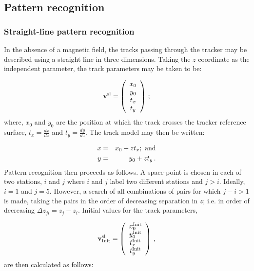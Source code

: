 \subsection{Pattern recognition}
\label{Sect:SciFiPatRec}

\subsubsection{Straight-line pattern recognition}
\label{SubSect:SciFiSLPatRec}

In the absence of a magnetic field, the tracks passing through the tracker may be described using a straight line in three dimensions. Taking the $z$ coordinate as the independent parameter, the track parameters may be taken to be:

\begin{equation}
 {\bf v^{\rm sl}} =
 \left( 
   \begin{array}{c}
     x_0 \\
     y_0 \\
     t_x \\
     t_y
   \end{array}
 \right)\,;
\end{equation}
where, $x_0$ and $y_0$ are the position at which the track crosses the tracker reference surface, $t_x = \frac{dx}{dz}$ and $t_y = \frac{dy}{dz}$. The track model may then be written:

\begin{eqnarray}
  x & = & x_0 + z t_x {\rm;~and} \\
  y & = & y_0 + z t_y \,.
\end{eqnarray}
Pattern recognition then proceeds as follows. A space-point is chosen in each of two stations, $i$ and $j$ where $i$ and $j$ label two different stations and $j>i$. Ideally, $i=1$ and $j=5$. However, a search of all combinations of pairs for which $j-i>1$ is made, taking the pairs in the order of decreasing separation in $z$; i.e. in order of decreasing $\Delta z_{ji} = z_j - z_i$. Initial values for the track parameters,

\begin{equation}
 {\bf v^{\rm sl}_{\rm Init}} =
 \left( 
   \begin{array}{c}
     x_0^{\rm Init} \\
     y_0^{\rm Init} \\
     t_x^{\rm Init} \\
     t_y^{\rm Init}
   \end{array}
 \right)\,,
\end{equation}
are then calculated as follows:


